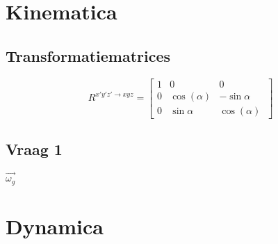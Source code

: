 \documentclass{article}
\begin{document}
\section{Kinematica}
\subsection{Transformatiematrices}
\[
R^{x'y'z' \rightarrow xyz}=
  \begin{bmatrix}
    1 & 0 & 0\\
    0 & \cos(\alpha) & -\sin{\alpha}\\ 
    0 & \sin{\alpha} & \cos(\alpha)\
    \end{bmatrix}
\]

\subsection{Vraag 1}
$\overrightarrow{\omega_{g}}$
\section{Dynamica}
\end{document}
